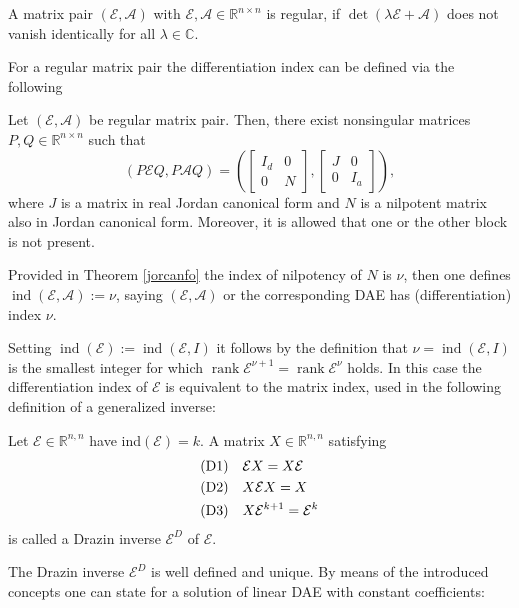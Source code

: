 \documentclass[a4paper,10pt,BCOR=15mm]{scrbook}
\DeclareMathOperator{\ind}{ind}
\DeclareMathOperator{\rank}{rank}
\begin{document}
\begin{defin}
A matrix pair  $(\mathcal{E},\mathcal{A})$ with $\mathcal{E},\mathcal{A} \in \mathbb R^{n \times n}$ is regular, if $\det(\lambda \mathcal{E}+\mathcal{A})$ does not vanish identically for all $\lambda \in \mathbb C$.
\end{defin}

For a regular matrix pair the differentiation index can be defined via the following

\begin{thm}\label{jorcanfo}
Let $(\mathcal{E},\mathcal{A})$ be regular matrix pair. Then, there exist nonsingular matrices $P,Q \in \mathbb R^{n \times n}$ such that 
\begin{equation*}
 (P\mathcal{E}Q,P\mathcal{A}Q)=\left( \begin{bmatrix} I_d & 0 \\ 0 & N \end{bmatrix},\begin{bmatrix} J & 0 \\ 0 & I_a \end{bmatrix} \right ),
\end{equation*}
where $J$ is a matrix in real Jordan canonical form and $N$ is a nilpotent matrix also in Jordan canonical form. Moreover, it is allowed that one or the other block is not present.
\end{thm}

Provided in Theorem \ref{jorcanfo} the index of nilpotency of $N$ is $\nu$, then one defines $\ind(\mathcal E, \mathcal A) := \nu$, saying $(\mathcal{E},\mathcal{A})$ or the corresponding DAE has (differentiation) index $\nu$. 

Setting $\ind (\mathcal E) := \ind (\mathcal E ,I)$ it follows by the definition that $\nu = \ind (\mathcal E, I)$ is the smallest integer for which $\rank \mathcal E^{\nu+1} = \rank \mathcal E^{\nu}$ holds. In this case the differentiation index of $\mathcal E$ is equivalent to the matrix index, used in the following definition of a generalized inverse:
\begin{defin}\label{drazin}
 Let $\mathcal{E} \in \mathbb{R}^{n,n}$ have ind$(\mathcal{E})=k$. A matrix $X \in \mathbb{R}^{n,n}$ satisfying 
\begin{align}
 &\mbox{(D1)} \quad \mathcal{E}X= X \mathcal{E} \notag \\
 &\mbox{(D2)} \quad  X\mathcal{E}X= X \label{drai} \\
  &\mbox{(D3)} \quad X\mathcal{E}^{k+1}= \mathcal{E}^{k} \notag
\end{align}
is called a Drazin inverse $ \mathcal{E}^D $ of $ \mathcal{E}$.
\end{defin}
The Drazin inverse $ \mathcal{E}^D $ is well defined and unique. By means of the introduced concepts one can state for a solution of linear DAE with constant coefficients:
\end{document}
